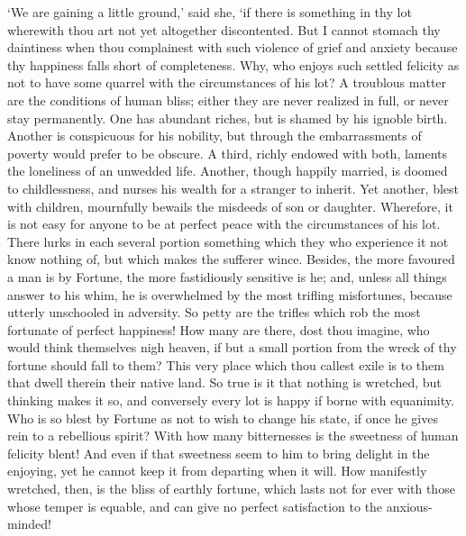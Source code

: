 \documentclass[12pt]{book}
\begin{document}
`We are gaining a little ground,' said she, `if there is something in
thy lot wherewith thou art not yet altogether discontented. But I cannot
stomach thy daintiness when thou complainest with such violence of grief
and anxiety because thy happiness falls short of completeness. Why, who
enjoys such settled felicity as not to have some quarrel with the
circumstances of his lot? A troublous matter are the conditions of human
bliss; either they are never realized in full, or never stay
permanently. One has abundant riches, but is shamed by his ignoble
birth. Another is conspicuous for his nobility, but through the
embarrassments of poverty would prefer to be obscure. A third, richly
endowed with both, laments the loneliness of an unwedded life. Another,
though happily married, is doomed to childlessness, and nurses his
wealth for a stranger to inherit. Yet another, blest with children,
mournfully bewails the misdeeds of son or daughter. Wherefore, it is not
easy for anyone to be at perfect peace with the circumstances of his
lot. There lurks in each several portion something which they who
experience it not know nothing of, but which makes the sufferer wince.
Besides, the more favoured a man is by Fortune, the more fastidiously
sensitive is he; and, unless all things answer to his whim, he is
overwhelmed by the most trifling misfortunes, because utterly unschooled
in adversity. So petty are the trifles which rob the most fortunate of
perfect happiness! How many are there, dost thou imagine, who would
think themselves nigh heaven, if but a small portion from the wreck of
thy fortune should fall to them? This very place which thou callest
exile is to them that dwell therein their native land. So true is it
that nothing is wretched, but thinking makes it so, and conversely every
lot is happy if borne with equanimity. Who is so blest by Fortune as not
to wish to change his state, if once he gives rein to a rebellious
spirit? With how many bitternesses is the sweetness of human felicity
blent! And even if that sweetness seem to him to bring delight in the
enjoying, yet he cannot keep it from departing when it will. How
manifestly wretched, then, is the bliss of earthly fortune, which lasts
not for ever with those whose temper is equable, and can give no perfect
satisfaction to the anxious-minded!
\end{document}
